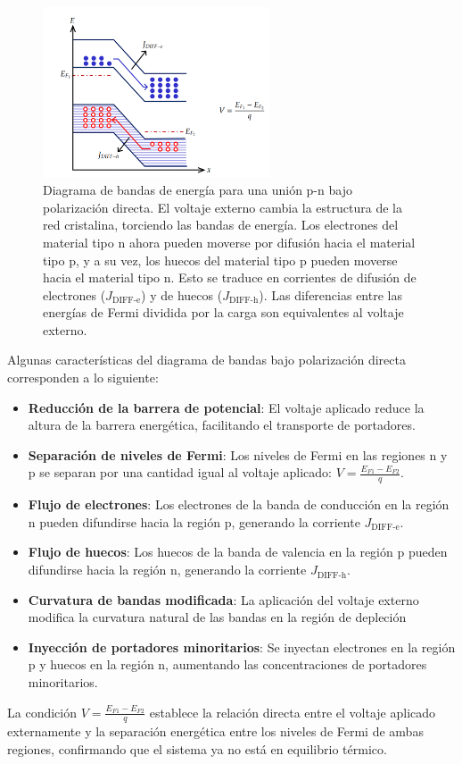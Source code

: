 \documentclass[
  11pt,
  letterpaper,
   addpoints,
  ]{exam}
\begin{document}
\begin{questions}
\begin{solution}
    \begin{figure}[H]
        \centering
        \includegraphics[width=0.6\textwidth]{../figures/Auxiliar_2_12}
        \caption{Diagrama de bandas de energía para una unión p-n bajo polarización directa. El voltaje externo cambia la estructura de la red cristalina, torciendo las bandas de energía. Los electrones del material tipo n ahora pueden moverse por difusión hacia el material tipo p, y a su vez, los huecos del material tipo p pueden moverse hacia el material tipo n. Esto se traduce en corrientes de difusión de electrones ($J_{\text{DIFF-e}}$) y de huecos ($J_{\text{DIFF-h}}$). Las diferencias entre las energías de Fermi dividida por la carga son equivalentes al voltaje externo.}
        \label{fig:bandas_polarizacion}
    \end{figure}

Algunas características del diagrama de bandas bajo polarización directa corresponden a lo siguiente:
    \begin{itemize}
        \item \textbf{Reducción de la barrera de potencial}: El voltaje aplicado reduce la altura de la barrera energética, facilitando el transporte de portadores.
        \item \textbf{Separación de niveles de Fermi}: Los niveles de Fermi en las regiones n y p se separan por una cantidad igual al voltaje aplicado: $V = \frac{E_{F1} - E_{F2}}{q}$.
        \item \textbf{Flujo de electrones}: Los electrones de la banda de conducción en la región n pueden difundirse hacia la región p, generando la corriente $J_{\text{DIFF-e}}$.
        \item \textbf{Flujo de huecos}: Los huecos de la banda de valencia en la región p pueden difundirse hacia la región n, generando la corriente $J_{\text{DIFF-h}}$.
        \item \textbf{Curvatura de bandas modificada}: La aplicación del voltaje externo modifica la curvatura natural de las bandas en la región de depleción
        \item \textbf{Inyección de portadores minoritarios}: Se inyectan electrones en la región p y huecos en la región n, aumentando las concentraciones de portadores minoritarios.
    \end{itemize}
    La condición $V = \frac{E_{F1} - E_{F2}}{q}$ establece la relación directa entre el voltaje aplicado externamente y la separación energética entre los niveles de Fermi de ambas regiones, confirmando que el sistema ya no está en equilibrio térmico.


\end{solution}
\end{questions}
\end{document}

